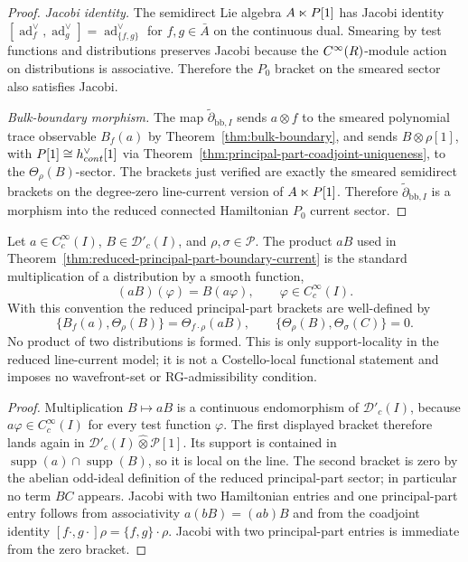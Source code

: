 \documentclass[11pt]{memoir}
\begin{document}
\begin{proof}
  \emph{Jacobi identity.} The semidirect Lie algebra
  $A\ltimes P[1]$ has Jacobi identity
  $[\operatorname{ad}^{\vee}_f,\operatorname{ad}^{\vee}_g]
    =\operatorname{ad}^{\vee}_{\{f,g\}}$ for $f,g\in\bar A$ on the
  continuous dual. Smearing by test functions and distributions
  preserves Jacobi because the $C^\infty(R)$-module action on
  distributions is associative. Therefore the
  $P_0$ bracket on the smeared sector also satisfies Jacobi.

	  \emph{Bulk-boundary morphism.} The map
	  \(\widetilde\partial_{\mathrm{bb},I}\) sends
	  \(a\otimes f\) to the smeared polynomial trace observable \(B_f(a)\) by
	  Theorem~\ref{thm:bulk-boundary}, and sends
	  \(B\otimes\rho[1]\), with
	  \(P[1]\cong h^\vee_{cont}[1]\) via
	  Theorem~\ref{thm:principal-part-coadjoint-uniqueness}, to the
	  \(\Theta_\rho(B)\)-sector. The brackets just verified are exactly the
	  smeared semidirect brackets on the degree-zero line-current version of
	  \(A\ltimes P[1]\). Therefore
	  \(\widetilde\partial_{\mathrm{bb},I}\) is a morphism into the reduced
	  connected Hamiltonian \(P_0\) current sector.
\end{proof}

\begin{lem}
  \label{lem:distribution-locality-principal-parts}
  Let \(a\in C^\infty_c(I)\), \(B\in\mathcal D'_c(I)\), and
  \(\rho,\sigma\in\mathcal P\).  The product \(aB\) used in
  Theorem~\ref{thm:reduced-principal-part-boundary-current} is the
  standard multiplication of a distribution by a smooth function,
  \[
    (aB)(\varphi)=B(a\varphi),\qquad \varphi\in C^\infty_c(I).
  \]
  With this convention the reduced principal-part brackets are
  well-defined by
  \[
    \{B_f(a),\Theta_\rho(B)\}=\Theta_{f\cdot\rho}(aB),
    \qquad
    \{\Theta_\rho(B),\Theta_\sigma(C)\}=0 .
  \]
	  No product of two distributions is formed.
	  This is only support-locality in the reduced line-current model; it is
	  not a Costello-local functional statement and imposes no wavefront-set or
	  RG-admissibility condition.
\end{lem}

\begin{proof}
  Multiplication \(B\mapsto aB\) is a continuous endomorphism of
  \(\mathcal D'_c(I)\), because \(a\varphi\in C^\infty_c(I)\) for every
  test function \(\varphi\).  The first displayed bracket therefore
  lands again in \(\mathcal D'_c(I)\widehat\otimes\mathcal P[1]\).  Its
  support is contained in
  \(\operatorname{supp}(a)\cap\operatorname{supp}(B)\), so it is local
  on the line.  The second bracket is zero by the abelian odd-ideal
  definition of the reduced principal-part sector; in particular no term
  \(BC\) appears.  Jacobi with two Hamiltonian entries and one
  principal-part entry follows from associativity
  \(a(bB)=(ab)B\) and from the coadjoint identity
  \([f\cdot,g\cdot]\rho=\{f,g\}\cdot\rho\).  Jacobi with two
  principal-part entries is immediate from the zero bracket.
\end{proof}
\end{document}

